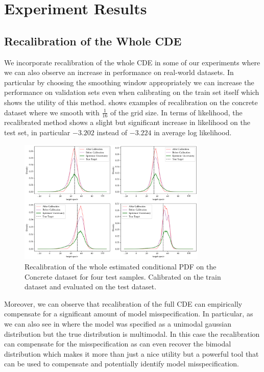 \section{Experiment Results}\label{sec:results}

\subsection{Recalibration of the Whole CDE}

We incorporate recalibration of the whole CDE in some of our experiments where we can also observe an increase in performance on real-world datasets. In particular by choosing the smoothing window appropriately we can increase the performance on validation sets even when calibrating on the train set itself which shows the utility of this method.  shows examples of recalibration on the concrete dataset where we smooth with $\frac{1}{16}$ of the grid size. In terms of likelihood, the recalibrated method shows a slight but significant increase in likelihood on the test set, in particular $-3.202$ instead of $-3.224$ in average log likelihood.

\begin{figure}
    \centering
    \includegraphics[width=0.8\textwidth]{resources/recalibration_concrete_dataset.png}
    \caption[Recalibration of the whole estimated conditional PDF]{Recalibration of the whole estimated conditional PDF on the Concrete dataset for four test samples. Calibrated on the train dataset and evaluated on the test dataset.}\label{fig:recalibration_concrete}
\end{figure}

Moreover, we can observe that recalibration of the full CDE can empirically compensate for a significant amount of model misspecification. In particular, as we can also see in  where the model was specified as a unimodal gaussian distribution but the true distribution is multimodal. In this case the recalibration can compensate for the misspecification as can even recover the bimodal distribution which makes it more than just a nice utility but a powerful tool that can be used to compensate and potentially identify model misspecification.

